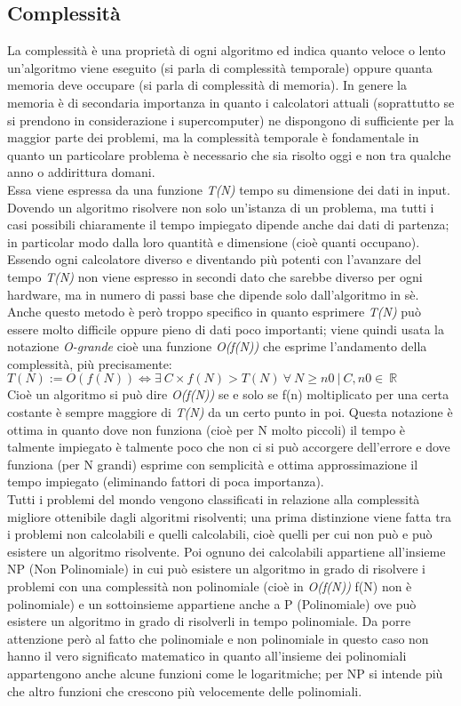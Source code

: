 \subsection{Complessità}
La complessità è una proprietà di ogni algoritmo ed indica quanto veloce o lento un'algoritmo viene eseguito (si parla di complessità temporale) oppure quanta memoria deve occupare (si parla di complessità di memoria).
In genere la memoria è di secondaria importanza in quanto i calcolatori attuali (soprattutto se si prendono in considerazione i supercomputer) ne dispongono di sufficiente per la maggior parte dei problemi, ma la complessità temporale è fondamentale in quanto un particolare problema è necessario che sia risolto oggi e non tra qualche anno o addirittura domani.\\
Essa viene espressa da una funzione \textit{T(N)} tempo su dimensione dei dati in input. Dovendo un algoritmo risolvere non solo un'istanza di un problema, ma tutti i casi possibili chiaramente il tempo impiegato dipende anche dai dati di partenza; in particolar modo dalla loro quantità e dimensione (cioè quanti occupano). Essendo ogni calcolatore diverso e diventando più potenti con l'avanzare del tempo \textit{T(N)} non viene espresso in secondi dato che sarebbe diverso per ogni hardware, ma in numero di passi base che dipende solo dall'algoritmo in sè. Anche questo metodo è però troppo specifico in quanto esprimere \textit{T(N)} può essere molto difficile oppure pieno di dati poco importanti; viene quindi usata la notazione \textit{O-grande} cioè una funzione \textit{O(f(N))} che esprime l'andamento della complessità, più precisamente:
$T(N) := O(f(N)) \iff \exists \ C\times f(N) > T(N)\ \forall \ N \geq n0 \ | \ C,n0 \in \ \mathbb{R} $\\
Cioè un algoritmo si può dire \textit{O(f(N))} se e solo se f(n) moltiplicato per una certa costante è sempre maggiore di \textit{T(N)} da un certo punto in poi. Questa notazione è ottima in quanto dove non funziona (cioè per N molto piccoli) il tempo è talmente impiegato è talmente poco che non ci si può accorgere dell'errore e dove funziona (per N grandi) esprime con semplicità e ottima approssimazione il tempo impiegato (eliminando fattori di poca importanza).\\
Tutti i problemi del mondo vengono classificati in relazione alla complessità migliore ottenibile dagli algoritmi risolventi; una prima distinzione viene fatta tra i problemi non calcolabili e quelli calcolabili, cioè quelli per cui non può e può esistere un algoritmo risolvente. Poi ognuno dei calcolabili appartiene all'insieme NP (Non Polinomiale) in cui può esistere un algoritmo in grado di risolvere i problemi con una complessità non polinomiale (cioè in \textit{O(f(N))} f(N) non è polinomiale) e un sottoinsieme appartiene anche a P (Polinomiale) ove può esistere un algoritmo in grado di risolverli in tempo polinomiale. Da porre attenzione però al fatto che polinomiale e non polinomiale in questo caso non hanno il vero significato matematico in quanto all'insieme dei polinomiali appartengono anche alcune funzioni come le logaritmiche; per NP si intende più che altro funzioni che crescono più velocemente delle polinomiali.\\
